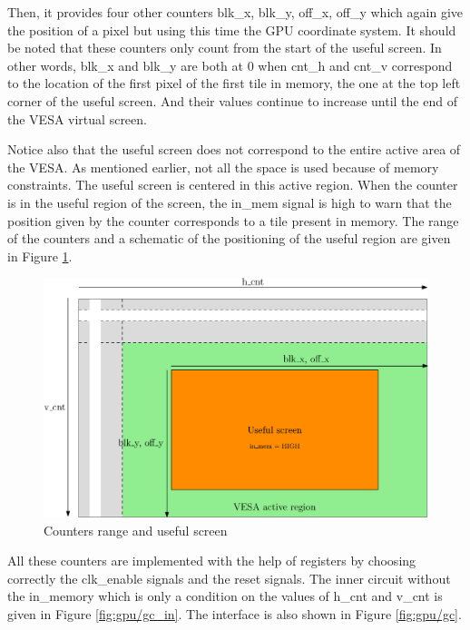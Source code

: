 Then, it provides four other counters blk\_x, blk\_y, off\_x, off\_y which again give the position 
of a pixel but using this time the GPU coordinate system. It should be noted that these counters 
only count from the start of the useful screen. In other words, blk\_x and blk\_y are both at 0 
when cnt\_h and cnt\_v correspond to the location of the first pixel of the first tile in 
memory, the one at the top left corner of the useful screen. And their values continue to increase 
until the end of the VESA virtual screen.

Notice also that the useful screen does not correspond to the entire active area of the 
VESA. As mentioned earlier, not all the space is used because of memory constraints. The useful 
screen is centered in this active region. When the counter is in the useful region of the screen, 
the in\_mem signal is high to warn that the position given by the counter corresponds to a tile 
present in memory. The range of the counters and a schematic of the positioning of the useful 
region are given in Figure \ref{fig:gpu/gc_screen}.

\begin{figure}[H]
    \centering
    \includegraphics[width=\linewidth]{Chapter4-GPU_CLKU/res/gc_screen}
    \caption{Counters range and useful screen}
    \label{fig:gpu/gc_screen}
\end{figure}

All these counters are implemented with the help of registers by choosing correctly the clk\_enable 
signals and the reset signals. The inner circuit without the in\_memory which is only a condition 
on the values of h\_cnt and v\_cnt is given in Figure \ref{fig:gpu/gc_in}. The interface is also shown in Figure \ref{fig:gpu/gc}.

